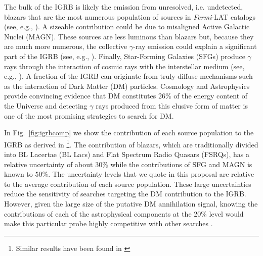 \documentclass[12 pt]{article}
\newcommand{\FIXME}[1]{{\color{red}{\em Comment: }{#1}}}
\begin{document}
The bulk of the IGRB is likely the emission from unresolved, i.e. undetected, blazars that are the most numerous population of sources in {\it Fermi}-LAT catalogs (see, e.g., \cite{Ajello:2015mfa}).
A sizeable contribution could be due to misaligned Active Galactic Nuclei (MAGN). 
These sources are less luminous than blazars but, because they are much more numerous, the collective $\gamma$-ray emission could explain a significant part of the IGRB (see, e.g., \cite{DiMauro:2013xta}).
Finally, Star-Forming Galaxies (SFGs) produce $\gamma$ rays through the interaction of cosmic rays with the interstellar medium (see, e.g., \cite{2012ApJ...755..164A}).
A fraction of the IGRB can originate from truly diffuse mechanisms such as the interaction of Dark Matter (DM) particles. Cosmology and Astrophysics provide convincing evidence that DM constitutes 26\% of the energy content of the Universe and detecting $\gamma$ rays produced from this elusive form of matter is one of the most promising strategies to search for DM.  

In Fig.~\ref{fig:igrbcomp} we show the contribution of each source population to the IGRB  as derived in \cite{DiMauro:2015tfa}\footnote{Similar results have been found in \cite{Ajello:2015mfa}}.
The contribution of blazars, which are traditionally divided into BL Lacertae (BL Lacs) and Flat Spectrum Radio Quasars (FSRQs), has a relative uncertainty of about $30\%$ while the contributions of SFG and MAGN is known to $50\%$.
The uncertainty levels that we quote in this proposal are relative to the average contribution of each source population.
These large uncertainties reduce the sensitivity of searches targeting the DM contribution to the IGRB.
However, given the large size of the putative DM annihilation signal, knowing the contributions of each of the 
astrophysical components at the 20\% level would make this particular probe highly competitive with 
other searches \cite{Charles:2016pgz}. 
\end{document}
